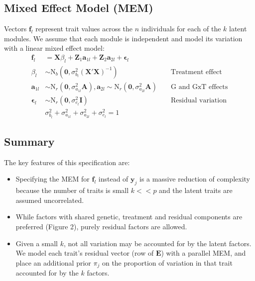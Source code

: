 \documentclass[landscape,paperwidth=48in,paperheight=36in,fontscale=0.35]{baposter}
\begin{document}
\begin{poster}
{\subsection*{Mixed Effect Model (MEM)}
Vectors $\mathbf{f}_l$ represent trait values across the $n$ individuals for each of the $k$ latent modules. We assume that each module is independent and model its variation with a linear mixed effect model:
\begin{align}
\mathbf{f}_{l} &= \mathbf{X} \beta_l + \mathbf{Z}_1 \mathbf{a}_{1l} + \mathbf{Z}_2 \mathbf{a}_{2l} + \boldsymbol{\epsilon}_l \\
\beta_l &\sim \mbox{N}_b(\mathbf{0},\sigma^2_{b_l} (\mathbf{X}'\mathbf{X})^{-1}) &&\mbox { Treatment effect} \nonumber \\
\mathbf{a}_{1l} &\sim \mbox{N}_r(\mathbf{0},\sigma^2_{a_{1l}} \mathbf{A}), \mathbf{a}_{2l} \sim \mbox{N}_r(\mathbf{0},\sigma^2_{a_{2l}} \mathbf{A}) 
	&&\mbox { G and GxT effects}  \nonumber \\
\mathbf{\epsilon}_l &\sim \mbox{N}_r(\mathbf{0},\sigma^2_{e_l} \mathbf{I}) &&\mbox { Residual variation}  \nonumber \\
&\sigma^2_{b_l} + \sigma^2_{a_{1l}} + \sigma^2_{a_{2l}} + \sigma^2_{e_l} = 1
\end{align}


\subsection*{Summary}
The key features of this specification are:
\begin{itemize}
\item Specifying the MEM for $\mathbf{f}_l$ instead of $\mathbf{y}_j$ is a massive reduction of complexity because the number of traits is small $k << p$ and the latent traits are assumed uncorrelated.
\item While factors with shared genetic, treatment and residual components are preferred (Figure 2), purely residual factors are allowed.
\item Given a small $k$, not all variation may be accounted for by the latent factors. We model each trait's residual vector (row of $\mathbf{E}$) with a parallel MEM, and place an additional prior $\pi_j$ on the proportion of variation in that trait accounted for by the $k$ factors.
\end{itemize}
}
\end{poster}
\end{document}
